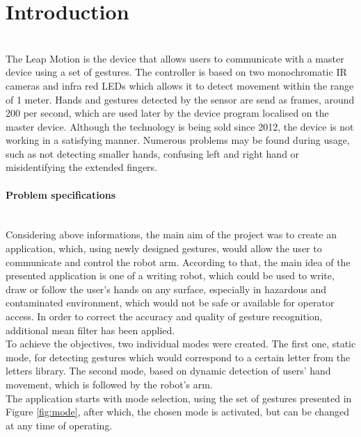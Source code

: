 \section{Introduction}

\mbox{}\\

The Leap Motion is the device that allows users to communicate with a master device using a set of gestures. The controller is based on two monochromatic IR cameras and infra red LEDs which allows it to detect movement within the range of 1 meter. Hands and gestures detected by the sensor are send as frames, around 200 per second, which are used later by the device program localised on the master device. Although the technology is being sold since 2012, the device is not working in a satisfying manner. Numerous problems may be found during usage, such as not detecting smaller hands, confusing left and right hand or misidentifying the extended fingers. \\

\paragraph{Problem specifications\\\\}

Considering above informations, the main aim of the project was to create an application, which, using newly designed gestures, would allow the user to communicate and control the robot arm. According to that, the main idea of the presented application is one of a writing robot, which could be used to write, draw or follow the user's hands on any surface, especially in hazardous and contaminated environment, which would not be safe or available for operator access. In order to correct the accuracy and quality of gesture recognition, additional mean filter has been applied.\\

To achieve the objectives, two individual modes were created. The first one, static mode, for detecting gestures which would correspond to a certain letter from the letters library. The second mode, based on dynamic detection of users' hand movement, which is followed by the robot's arm. \\

The application starts with mode selection, using the set of gestures presented in Figure \ref{fig:mode}, after which, the chosen mode is activated, but can be changed at any time of operating.


